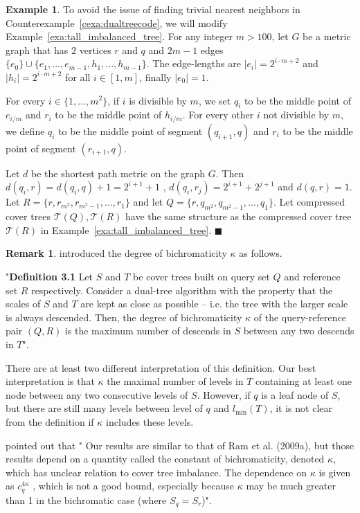 \documentclass[a4paper,UKenglish,cleveref, autoref]{lipics-v2019}
\numberwithin{algocf}{section}
\theoremstyle{definition}
\newtheorem{rem}[algocf]{Remark}
\theoremstyle{definition}
\newtheorem{exa}[algocf]{Example}
\theoremstyle{definition}
\theoremstyle{plain}
\newcommand{\T}{\mathcal{T}}
\newcommand{\bs}{\hfill $\blacksquare$}
\begin{document}
\begin{exa}
\label{exa:dualtreeprooffaultyconst}
To avoid the issue of finding trivial nearest neighbors in Counterexample~\ref{cexa:dualtreecode}, we will modify Example~\ref{exa:tall_imbalanced_tree}. 
For any integer $m > 100$, let $G$ be a metric graph that has $2$ vertices $r$ and $q$ and $2m-1$ edges $\{e_{0}\} \cup \{e_{1}, ..., e_{m-1},h_{1},..., h_{m-1}\}$.
The edge-lengths are $|e_i| = 2^{i \cdot m+2}$ and $|h_i| = 2^{i \cdot m+2}$  for all $i \in [1,m]$, finally $|e_{0}| = 1$.
\medskip

For every $i \in \{1, ..., m^2\}$, if $i$ is divisible by $m$, we set $q_{i}$ to be the middle point of $e_{i / m}$ and $r_{i}$ to be the middle point of $h_{i / m}$. 
For every other $i$ not divisible by $m$, we define $q_i$ to be the middle point of segment $(q_{i+1}, q)$ and $r_i$ to be the middle point of segment $(r_{i+1}, q)$.
\medskip

Let $d$ be the shortest path metric on the graph $G$. 
Then $d(q_i,r) = d(q_i, q) + 1 = 2^{i+1} + 1$ , $d(q_i, r_j) = 2^{i+1} + 2^{j+1}$ and $d(q,r) = 1$. 
Let $R = \{r, r_{m^2}, r_{m^2-1}, ..., r_1\}$ and let $Q = \{r,  q_{m^2}, q_{m^2-1}, ..., q_1 \}$. 
Let compressed cover trees $\T(Q),\T(R)$ have the same structure as the compressed cover tree $\T(R)$ in Example~\ref{exa:tall_imbalanced_tree}.
\bs
\end{exa}

\begin{rem}
\label{rem:kappa}
\cite[Definition~3.1]{ram2009linear} introduced the degree of bichromaticity $\kappa$ as follows. 
\medskip

"\textbf{Definition 3.1} Let $S$ and $T$ be cover trees built on query set $Q$ and reference set $R$ respectively.
Consider a dual-tree algorithm with the property that the scales of $S$ and $T$ are kept as close as
possible – i.e. the tree with the larger scale is always descended. Then, the degree of bichromaticity
$\kappa$ of the query-reference pair $(Q, R)$ is the maximum number of descends in $S$ between any two
descends in $T$".
\medskip

There are at least two different interpretation of this definition. Our best interpretation is that $\kappa$ the maximal number of levels in $T$ containing at least one node between any two consecutive levels of $S$. However, if $q$ is a leaf node of $S$, but there are still many levels between level of $q$ and $l_{\min}(T)$, it is not clear from the definition if $\kappa$ includes these levels.
\medskip

\cite[page~3284]{curtin2015plug} pointed out that "
Our results are similar to that of Ram et al. (2009a), but those results depend on a
quantity called the constant of bichromaticity, denoted $\kappa$, which has unclear relation to
cover tree imbalance. The dependence on $\kappa$ is given as $c_q^{4\kappa}$ , which is not a good bound,
especially because $\kappa$ may be much greater than 1 in the bichromatic case (where $S_q = S_r$)".
\end{rem}
\end{document}
